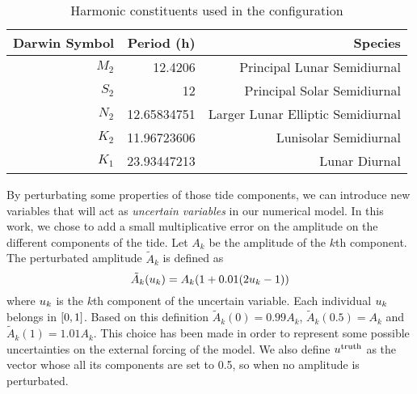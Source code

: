 \documentclass[../../Main_ManuscritThese.tex]{subfiles}
\begin{document}
\begin{table}[!h]
  \centering
  \begin{tabular}{rrr}\toprule
    Darwin Symbol & Period (h)   & Species                           \\ \midrule
    $M_2$         & 12.4206      & Principal Lunar Semidiurnal       \\
    $S_2$         & 12           & Principal Solar Semidiurnal       \\
    $N_2$         & 12.65834751  & Larger Lunar Elliptic Semidiurnal \\
    $K_2$         & 11.96723606  & Lunisolar Semidiurnal             \\
    $K_1$         & 23.93447213  & Lunar Diurnal                     \\
    \bottomrule
  \end{tabular}
  \caption{Harmonic constituents used in the configuration}
  \label{tab:tides_components}
\end{table}
By perturbating some properties of those tide components, we can
introduce new variables that will act as \emph{uncertain variables} in
our numerical model.  In this work, we chose to add a small
multiplicative error on the amplitude on the different components of
the tide. Let $A_k$ be the amplitude of the $k$th component. The
perturbated amplitude $\tilde{A}_k$ is defined as
\begin{equation}
  \label{eq:tide_error}
  \tilde{A}_k(u_k) = A_k (1 + 0.01(2u_k - 1))
\end{equation}
where $u_k$ is the $k$th component of the uncertain variable. Each
individual $u_k$ belongs in $\interval{0}{1}$. Based on this
definition $\tilde{A}_k(0) = 0.99A_k$, $\tilde{A}_k(0.5) = A_k$ and
$\tilde{A}_k(1) = 1.01A_k$. This choice has been made in order to
represent some possible uncertainties on the external forcing of the
model. We also define $u^{\mathrm{truth}}$ as the vector whose all
its components are set to \num{0.5}, so when no amplitude is
perturbated.
\end{document}
